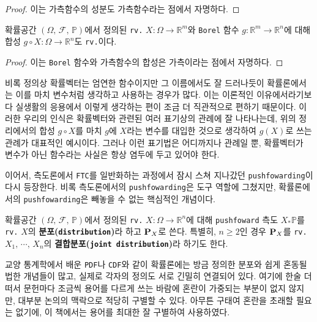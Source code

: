 \begin{proof}
    이는 가측함수의 성분도 가측함수라는 점에서 자명하다.
\end{proof}

\begin{theorem}
    확률공간 $(\Omega,\,\mathcal{F},\,\mathbb{P})$에서 정의된 \texttt{rv.} $X:\Omega\to\mathbb{R}^m$와 \texttt{Borel} 함수 $g:\mathbb{R}^m\to\mathbb{R}^n$에 대해 합성 $g\circ X:\Omega\to\mathbb{R}^n$도 \texttt{rv.}이다.
\end{theorem}

\begin{proof}
    이는 \texttt{Borel} 함수와 가측함수의 합성은 가측이라는 점에서 자명하다.
\end{proof}

비록 정의상 확률벡터는 엄연한 함수이지만 그 이름에서도 잘 드러나듯이 확률론에서는 이를 마치 변수처럼 생각하고 사용하는 경우가 많다. 이는 이론적인 이유에서라기보다 실생활의 응용에서 이렇게 생각하는 편이 조금 더 직관적으로 편하기 때문이다. 이러한 우리의 인식은 확률벡터와 관련된 여러 표기상의 관례에 잘 나타나는데, 위의 정리에서의 합성 $g\circ X$를 마치 $g$에 $X$라는 변수를 대입한 것으로 생각하여 $g(X)$로 쓰는 관례가 대표적인 예시이다. 그러나 이런 표기법은 어디까지나 관례일 뿐, 확률벡터가 변수가 아닌 함수라는 사실은 항상 염두에 두고 있어야 한다.

이어서, 측도론에서 \texttt{FTC}를 일반화하는 과정에서 잠시 스쳐 지나갔던 \texttt{pushfowarding}이 다시 등장한다. 비록 측도론에서의 \texttt{pushfowarding}은 도구 역할에 그쳤지만, 확률론에서의 \texttt{pushfowarding}은 빼놓을 수 없는 핵심적인 개념이다.

\begin{definition}
    확률공간 $(\Omega,\,\mathcal{F},\,\mathbb{P})$에서 정의된 \texttt{rv.} $X:\Omega\to\mathbb{R}^n$에 대해 \texttt{pushfoward} 측도 $X_*\mathbb{P}$를 \texttt{rv.} $X$의 \textbf{분포(\texttt{distribution})}라 하고 $\mathbf{P}_X$로 쓴다. 특별히, $n\geq2$인 경우 $\mathbf{P}_X$를 \texttt{rv.} $X_1,\,\cdots,\,X_n$의 \textbf{결합분포(\texttt{joint distribution})}라 하기도 한다.
\end{definition}

교양 통계학에서 배운 \texttt{PDF}나 \texttt{\texttt{CDF}}와 같이 확률론에는 방금 정의한 분포와 쉽게 혼동될 법한 개념들이 많고, 실제로 각자의 정의도 서로 긴밀히 연결되어 있다. 여기에 한술 더 떠서 문헌마다 조금씩 용어를 다르게 쓰는 바람에 혼란이 가중되는 부분이 없지 않지만, 대부분 논의의 맥락으로 적당히 구별할 수 있다. 아무튼 구태여 혼란을 초래할 필요는 없기에, 이 책에서는 용어를 최대한 잘 구별하여 사용하였다.

